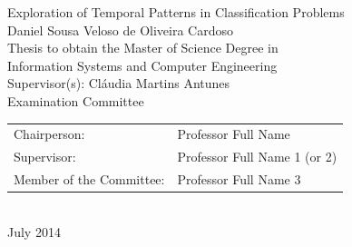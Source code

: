 \begin{center}
%
\vspace{5cm}

\vspace{1.0cm}
{\FontLb Exploration of Temporal Patterns in Classification Problems} \\
\vspace{2.7cm}
{\FontMb Daniel Sousa Veloso de Oliveira Cardoso} \\
\vspace{2.0cm}
{\FontSn Thesis to obtain the Master of Science Degree in} \\
\vspace{0.3cm}
{\FontLb Information Systems and Computer Engineering} \\
\vspace{1.1cm}
{\FontSn Supervisor(s): Cláudia Martins Antunes} \\
\vspace{1.1cm}
{\FontMb Examination Committee} \\
\vspace{0.3cm}
{\FontSn %
\begin{tabular}{ll}
Chairperson: & Professor Full Name \\
Supervisor: & Professor Full Name 1 (or 2) \\
Member of the Committee: & Professor Full Name 3
\end{tabular} } \\
\vspace{1.5cm}
{\FontMb July 2014} \\
%
\end{center}

\cleardoublepage

